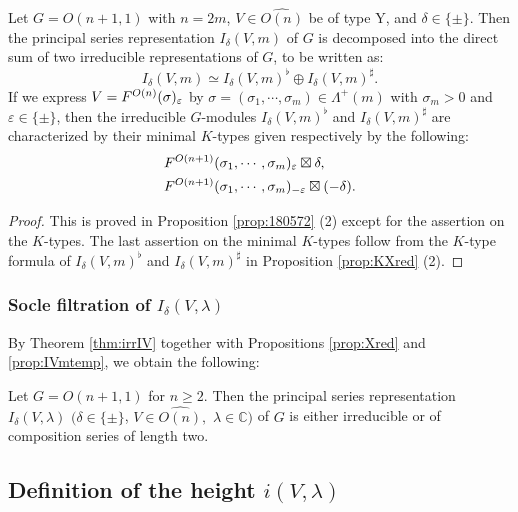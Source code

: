 \begin{proposition}
\label{prop:IVmtemp}
Let $G=O(n+1,1)$ with $n=2m$, 
 $V\in \widehat{O(n)}$ be of type Y, 
 and $\delta \in \{\pm\}$.  
Then the principal series representation
 $I_{\delta}(V,m)$ of $G$
 is decomposed
 into the direct sum
 of two irreducible representations of $G$,
 to be written as:
\[
  I_{\delta}(V,m)
  \simeq
  I_{\delta}(V,m)^{\flat} 
  \oplus
  I_{\delta}(V,m)^{\sharp}.  
\]
If we express $V=F^{{O(n)}}({\sigma})_{\varepsilon}$
 by $\sigma=(\sigma_1, \cdots, \sigma_m) \in \Lambda^+(m)$
 with $\sigma_m >0$
 and $\varepsilon \in \{\pm\}$, 
 then the irreducible $G$-modules
 $I_{\delta}(V,m)^{\flat}$ and $I_{\delta}(V,m)^{\sharp}$
 are characterized by their minimal $K$-types
 given respectively by the following:
\begin{align*}
 & F^{{O(n+1)}}({\sigma_1, \cdots, \sigma_m})_{\varepsilon} \boxtimes \delta, 
\\
 & F^{{O(n+1)}}({\sigma_1, \cdots, \sigma_m})_{-\varepsilon} \boxtimes (-\delta).  
\end{align*}
\end{proposition}
\begin{proof}
This is proved in Proposition \ref{prop:180572} (2)
 except for the assertion on the $K$-types.  
The last assertion on the minimal $K$-types follow from 
 the $K$-type formula
 of $I_{\delta}(V,m)^{\flat}$ and $I_{\delta}(V,m)^{\sharp}$
 in Proposition \ref{prop:KXred} (2).  
\end{proof}

\subsubsection{Socle filtration of $I_{\delta}(V,\lambda)$}
By Theorem \ref{thm:irrIV}
 together with Propositions \ref{prop:Xred} and \ref{prop:IVmtemp}, 
 we obtain the following:
\begin{corollary}
\label{cor:length2}
Let $G=O(n+1,1)$ for $n \ge 2$.  
Then the principal series representation
 $I_{\delta}(V,\lambda)$
 $(\delta \in \{\pm\}$, $V \in \widehat{O(n)},$ $\lambda \in {\mathbb{C}})$
 of $G$ 
 is either irreducible or of composition 
 series of length two.  
\end{corollary}




\subsection{Definition of the height $i(V,\lambda)$}
\label{subesec:defiVlmd}

